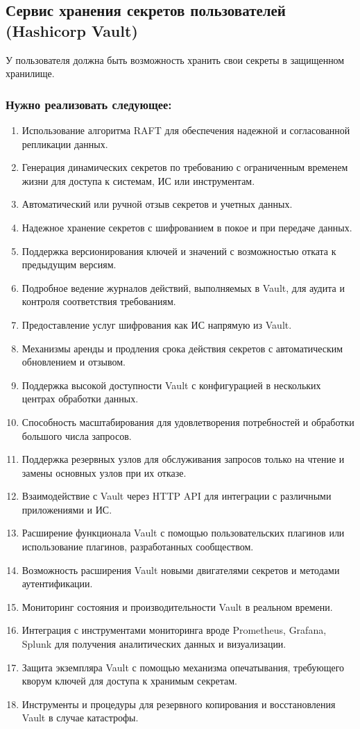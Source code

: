 \documentclass[14pt, a4paper]{extarticle}
\begin{document}
\subsection{Сервис хранения секретов пользователей\\ (Hashicorp Vault)}

У пользователя должна быть возможность хранить свои секреты в защищенном хранилище.

\subsubsection*{Нужно реализовать следующее:}

\begin{enumerate}
\item Использование алгоритма RAFT для обеспечения надежной и согласованной репликации данных.
\item Генерация динамических секретов по требованию с ограниченным временем жизни для доступа к системам, ИС или инструментам.
\item Автоматический или ручной отзыв секретов и учетных данных.
\item Надежное хранение секретов с шифрованием в покое и при передаче данных.
\item Поддержка версионирования ключей и значений с возможностью отката к предыдущим версиям.
\item Подробное ведение журналов действий, выполняемых в Vault, для аудита и контроля соответствия требованиям.
\item Предоставление услуг шифрования как ИС напрямую из Vault.
\item Механизмы аренды и продления срока действия секретов с автоматическим обновлением и отзывом.
\item Поддержка высокой доступности Vault с конфигурацией в нескольких центрах обработки данных.
\item Способность масштабирования для удовлетворения потребностей и обработки большого числа запросов.
\item Поддержка резервных узлов для обслуживания запросов только на чтение и замены основных узлов при их отказе.
\item Взаимодействие с Vault через HTTP API для интеграции с различными приложениями и ИС.
\item Расширение функционала Vault с помощью пользовательских плагинов или использование плагинов, разработанных сообществом.
\item Возможность расширения Vault новыми двигателями секретов и методами аутентификации.
\item Мониторинг состояния и производительности Vault в реальном времени.
\item Интеграция с инструментами мониторинга вроде Prometheus, Grafana, Splunk для получения аналитических данных и визуализации.
\item Защита экземпляра Vault с помощью механизма опечатывания, требующего кворум ключей для доступа к хранимым секретам.
\item Инструменты и процедуры для резервного копирования и восстановления Vault в случае катастрофы.
\end{enumerate}
\end{document}
